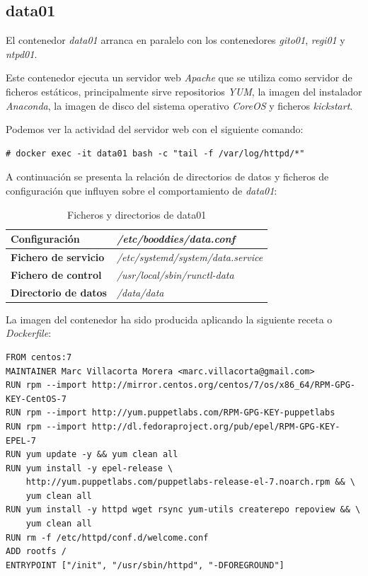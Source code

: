 \documentclass[a4paper,12pt,spanish,final]{epsc_tfc_pfc}
\begin{document}
\subsection{data01}

El contenedor \emph{data01} arranca en paralelo con los contenedores \emph{gito01}, \emph{regi01} y \emph{ntpd01}.

Este contenedor ejecuta un servidor web \emph{Apache} que se utiliza como servidor de ficheros estáticos, principalmente sirve repositorios \emph{YUM}, la imagen del instalador \emph{Anaconda}, la imagen de disco del sistema operativo \emph{CoreOS} y ficheros \emph{kickstart}.

Podemos ver la actividad del servidor web con el siguiente comando:\\

\begin{lstlisting}[style=dnsmasq]
# docker exec -it data01 bash -c "tail -f /var/log/httpd/*"
\end{lstlisting}

A continuación se presenta la relación de directorios de datos y ficheros de configuración que influyen sobre el comportamiento de \emph{data01}:

\begin{table}[h]

  \centering

  \begin{tabular}{ll}
    \toprule
    \textbf{Configuración}        & \textit{/etc/booddies/data.conf}          \\
    \midrule
    \rowcolor[HTML]{EFEFEF}
    \textbf{Fichero de servicio}  & \textit{/etc/systemd/system/data.service} \\
    \midrule
    \textbf{Fichero de control}   & \textit{/usr/local/sbin/runctl-data}      \\
    \midrule
    \rowcolor[HTML]{EFEFEF}
    \textbf{Directorio de datos}  & \textit{/data/data}                       \\
    \bottomrule
  \end{tabular}

  \caption{Ficheros y directorios de data01}

\end{table}

La imagen del contenedor ha sido producida aplicando la siguiente receta o \emph{Dockerfile}:\\

\begin{lstlisting}[style=dnsmasq]
FROM centos:7
MAINTAINER Marc Villacorta Morera <marc.villacorta@gmail.com>
RUN rpm --import http://mirror.centos.org/centos/7/os/x86_64/RPM-GPG-KEY-CentOS-7
RUN rpm --import http://yum.puppetlabs.com/RPM-GPG-KEY-puppetlabs
RUN rpm --import http://dl.fedoraproject.org/pub/epel/RPM-GPG-KEY-EPEL-7
RUN yum update -y && yum clean all
RUN yum install -y epel-release \
    http://yum.puppetlabs.com/puppetlabs-release-el-7.noarch.rpm && \
    yum clean all
RUN yum install -y httpd wget rsync yum-utils createrepo repoview && \
    yum clean all
RUN rm -f /etc/httpd/conf.d/welcome.conf
ADD rootfs /
ENTRYPOINT ["/init", "/usr/sbin/httpd", "-DFOREGROUND"]
\end{lstlisting}
\end{document}
